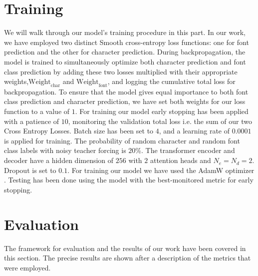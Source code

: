\documentclass[conference]{IEEEtran}
\begin{document}
\section{Training}\label{training}
We will walk through our model's training procedure in this part. In our work, we have employed two distinct Smooth cross-entropy loss functions: one for font prediction and the other for character prediction. During backpropagation, the model is trained to simultaneously optimize both character prediction and font class prediction by adding these two losses multiplied with their appropriate weights,\(\text{Weight}_\text{char}\) and \(\text{Weight}_\text{font}\), and logging the cumulative total loss for backpropagation. To ensure that the model gives equal importance to both font class prediction and character prediction, we have set both weights for our loss function to a value of $1$. For training our model early stopping has been applied with a patience of $10$, monitoring the validation total loss i.e. the sum of our two Cross Entropy Losses. Batch size has been set to $4$, and a learning rate of $0.0001$ is applied for training. The probability of random character and random font class labels with noisy teacher forcing is $20$\%. The transformer encoder and decoder have a hidden dimension of $256$ with $2$ attention heads and $N_e = N_d = 2$. Dropout is set to $0.1$. For training our model we have used the AdamW optimizer \cite{loshchilov2019decoupled}. Testing has been done using the model with the best-monitored metric for early stopping.

\section{Evaluation}\label{evaluation}
The framework for evaluation and the results of our work have been covered in this section. The precise results are shown after a description of the metrics that were employed. 
\end{document}
